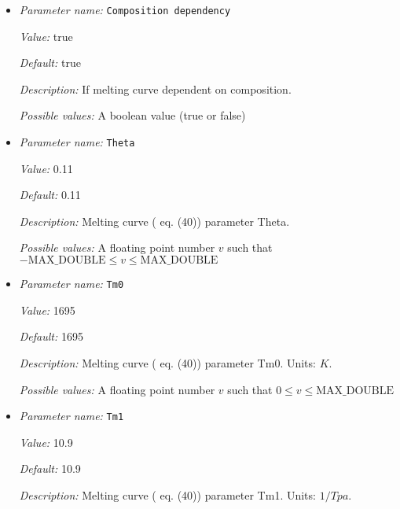 \begin{itemize}
\item {\it Parameter name:} {\tt Composition dependency}
\label{parameters:Boundary temperature model/Dynamic core/Geotherm parameters/Composition dependency}


{\it Value:} true


{\it Default:} true


{\it Description:} If melting curve dependent on composition.


{\it Possible values:} A boolean value (true or false)
\item {\it Parameter name:} {\tt Theta}
\label{parameters:Boundary temperature model/Dynamic core/Geotherm parameters/Theta}


{\it Value:} 0.11


{\it Default:} 0.11


{\it Description:} Melting curve (\cite{NPB+04} eq. (40)) parameter Theta.


{\it Possible values:} A floating point number $v$ such that $-\text{MAX\_DOUBLE} \leq v \leq \text{MAX\_DOUBLE}$
\item {\it Parameter name:} {\tt Tm0}
\label{parameters:Boundary temperature model/Dynamic core/Geotherm parameters/Tm0}


{\it Value:} 1695


{\it Default:} 1695


{\it Description:} Melting curve (\cite{NPB+04} eq. (40)) parameter Tm0. Units: $K$.


{\it Possible values:} A floating point number $v$ such that $0 \leq v \leq \text{MAX\_DOUBLE}$
\item {\it Parameter name:} {\tt Tm1}
\label{parameters:Boundary temperature model/Dynamic core/Geotherm parameters/Tm1}


{\it Value:} 10.9


{\it Default:} 10.9


{\it Description:} Melting curve (\cite{NPB+04} eq. (40)) parameter Tm1. Units: $1/Tpa$.



\end{itemize}

